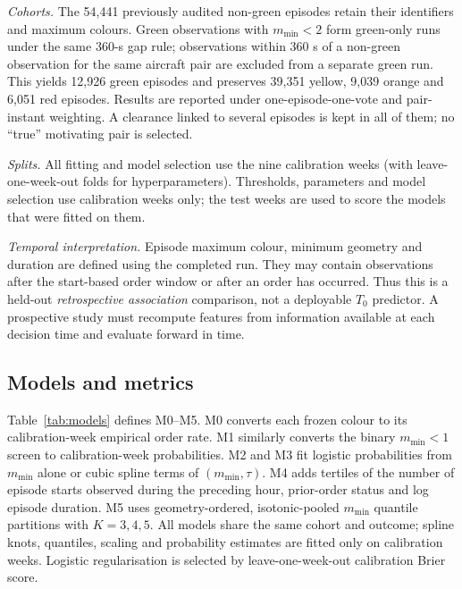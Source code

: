 \documentclass[pdflatex,sn-mathphys-num]{sn-jnl}
\newcommand{\mmin}{m_{\min}}
\begin{document}
\emph{Cohorts.} The 54,441 previously audited non-green episodes retain their identifiers and maximum colours. Green observations with $\mmin<2$ form green-only runs under the same 360-s gap rule; observations within 360 s of a non-green observation for the same aircraft pair are excluded from a separate green run. This yields 12,926 green episodes and preserves 39,351 yellow, 9,039 orange and 6,051 red episodes. Results are reported under one-episode-one-vote and pair-instant weighting. A clearance linked to several episodes is kept in all of them; no ``true'' motivating pair is selected.

\emph{Splits.} All fitting and model selection use the nine calibration weeks (with leave-one-week-out folds for hyperparameters). Thresholds, parameters and model selection use calibration weeks only; the test weeks are used to score the models that were fitted on them.

\emph{Temporal interpretation.} Episode maximum colour, minimum geometry and duration are defined using the completed run. They may contain observations after the start-based order window or after an order has occurred. Thus this is a held-out \emph{retrospective association} comparison, not a deployable $T_0$ predictor. A prospective study must recompute features from information available at each decision time and evaluate forward in time.

\subsection{Models and metrics}
Table~\ref{tab:models} defines M0--M5. M0 converts each frozen colour to its calibration-week empirical order rate. M1 similarly converts the binary $\mmin<1$ screen to calibration-week probabilities. M2 and M3 fit logistic probabilities from $\mmin$ alone or cubic spline terms of $(\mmin,\tau)$. M4 adds tertiles of the number of episode starts observed during the preceding hour, prior-order status and log episode duration. M5 uses geometry-ordered, isotonic-pooled $\mmin$ quantile partitions with $K=3,4,5$. All models share the same cohort and outcome; spline knots, quantiles, scaling and probability estimates are fitted only on calibration weeks. Logistic regularisation is selected by leave-one-week-out calibration Brier score.
\end{document}
